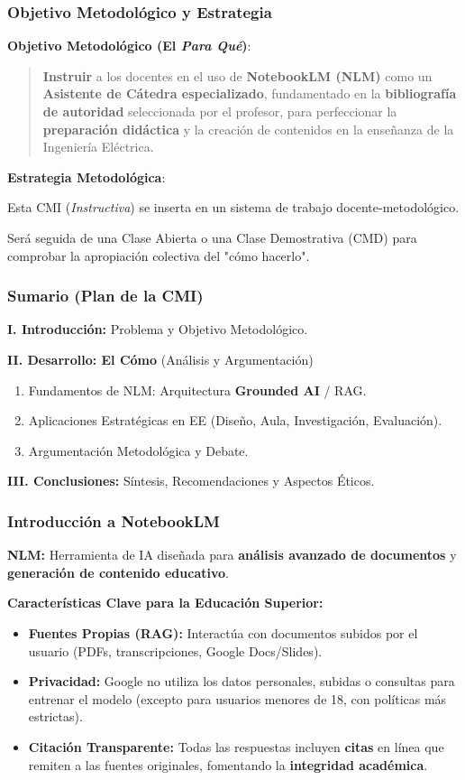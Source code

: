 \documentclass[aspectratio=43]{beamer}
\begin{document}
\begin{frame}
\frametitle{Objetivo Metodológico y Estrategia}

\textbf{Objetivo Metodológico (El \textit{Para Qué})}:
\begin{quote}
\textbf{Instruir} a los docentes en el uso de \textbf{NotebookLM (NLM)} como un \textbf{Asistente de Cátedra especializado}, fundamentado en la \textbf{bibliografía de autoridad} seleccionada por el profesor, para perfeccionar la \textbf{preparación didáctica} y la creación de contenidos en la enseñanza de la Ingeniería Eléctrica.
\end{quote}
\vfill
\textbf{Estrategia Metodológica}:
\begin{itemize}
  {\small
    \item Esta CMI (\textit{Instructiva}) se inserta en un sistema de trabajo docente-metodológico.
    \item Será seguida de una Clase Abierta o una Clase Demostrativa (CMD) para comprobar la apropiación colectiva del "cómo hacerlo".
  }
  \end{itemize}
\end{frame}

\begin{frame}
\frametitle{Sumario (Plan de la CMI)}

\textbf{I. Introducción:} Problema y Objetivo Metodológico.

\textbf{II. Desarrollo: El Cómo} (Análisis y Argumentación)
\begin{enumerate}
    \item Fundamentos de NLM: Arquitectura \textbf{Grounded AI} / RAG.
    \item Aplicaciones Estratégicas en EE (Diseño, Aula, Investigación, Evaluación).
    \item Argumentación Metodológica y Debate.
\end{enumerate}

\textbf{III. Conclusiones:} Síntesis, Recomendaciones y Aspectos Éticos.
\end{frame}

\begin{frame}
\frametitle{Introducción a NotebookLM}

\textbf{NLM:} Herramienta de IA diseñada para \textbf{análisis avanzado de documentos} y \textbf{generación de contenido educativo}.

\vfill
\textbf{Características Clave para la Educación Superior:}
\begin{itemize}
    \item \textbf{Fuentes Propias (RAG):} Interactúa con documentos subidos por el usuario (PDFs, transcripciones, Google Docs/Slides).
    \item \textbf{Privacidad:} Google no utiliza los datos personales, subidas o consultas para entrenar el modelo (excepto para usuarios menores de 18, con políticas más estrictas).
    \item \textbf{Citación Transparente:} Todas las respuestas incluyen \textbf{citas} en línea que remiten a las fuentes originales, fomentando la \textbf{integridad académica}.
\end{itemize}
\end{frame}
\end{document}
